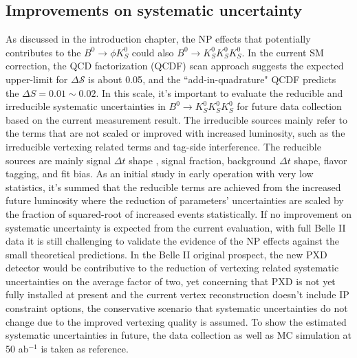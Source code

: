 \subsection{Improvements on systematic uncertainty}
As discussed in the introduction chapter, the NP effects that potentially contributes to the $B^0\to \phi K_S^0$ could also $B^0 \to K_S^0  K_S^0  K_S^0$. In the current SM correction, the QCD factorization (QCDF) scan approach suggests the expected upper-limit for $\Delta \mathcal{S}$ is about 0.05\cite{b2book}, and the ``add-in-quadrature" QCDF predicts the $\Delta S = 0.01 \sim 0.02$\cite{b2book}. In this scale, it's important to evaluate the reducible and irreducible systematic uncertainties in $B^0 \to K_S^0  K_S^0  K_S^0$ for future data collection based on the current measurement result. 
The irreducible sources mainly refer to the terms that are not scaled or improved with increased luminosity, such as the irreducible vertexing related terms and tag-side interference. The reducible sources are mainly signal $\Delta t$ shape , signal fraction, background $\Delta t$ shape, flavor tagging, and fit bias. As an initial study in early operation with very low statistics, it's summed that the reducible terms are achieved from the increased future luminosity where the reduction of parameters' uncertainties are scaled by the fraction of squared-root of increased events statistically. If no improvement on systematic uncertainty is expected from the current evaluation, with full Belle II data it is still challenging to validate the evidence of the NP effects against the small theoretical predictions. In the Belle II original prospect, the new PXD detector would be contributive to the reduction of vertexing related systematic uncertainties on the average factor of two\cite{b2book}, yet concerning that PXD is not yet fully installed at present and the current vertex reconstruction doesn't include IP constraint options, the conservative scenario that systematic uncertainties do not change due to the improved vertexing quality is assumed. To show the estimated systematic uncertainties in future, the data collection as well as MC simulation at 50 ab$^{-1}$ is taken as reference.

